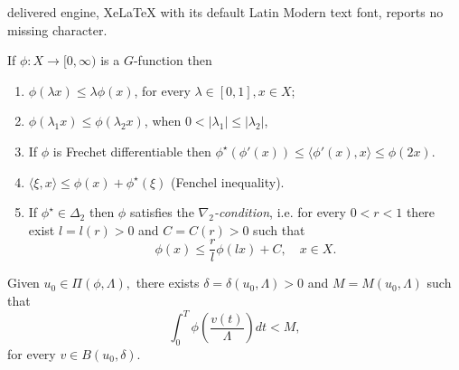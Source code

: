 \documentclass[10pt,a4paper]{amsart}
\begin{document}
delivered engine, XeLaTeX with its default Latin Modern text font, reports no missing character.
\begin{Propos}\label{propos:Gfuncion_elementales} If $\phi:X\to [0,\infty)$ is a $G$-function then

\begin{enumerate}
 \item     $\phi(\lambda x)\leq \lambda\phi(x)$, for every  $\lambda\in[0,1],x\in X$;
 \item $\phi(\lambda_1 x)\leq\phi(\lambda_2 x)$, when  $0<|\lambda_1|\leq |\lambda_2| $,
 \item If $\phi$ is Frechet differentiable then $\phi^{\star}\left(\phi'(x) \right)\leq \langle \phi'(x),x\rangle\leq \phi(2x)$.
  \item $\langle \xi , x\rangle \leq  \phi(x)+\phi^{\star}(\xi)$ (Fenchel inequality).
\item If $\phi^{\star}\in\Delta_2$ then $\phi$ satisfies the \emph{$\nabla_2$-condition}, i.e.  for every $0<r<1$ there exist $l=l(r)>0$ and $C=C(r)>0$ such that
\begin{equation}\label{eq:nabla2}
  \phi(x)\leq \frac{r}{l}\phi(l x)+C,\quad x\in X.
\end{equation}



\end{enumerate}

\end{Propos}

\begin{lem}\label{lema:cotauniforme}
Given $u_0 \in \Pi(\phi, \Lambda),$ there exists $ \delta=\delta(u_0,\Lambda)>0$ and $ M=M(u_0,\Lambda)$ such that
\[\int_0^T{\phi \left(\frac{v(t)}{\Lambda}\right) dt}< M,\] 
for every  $ v \in B(u_0, \delta)$.
\end{lem}
\end{document}
